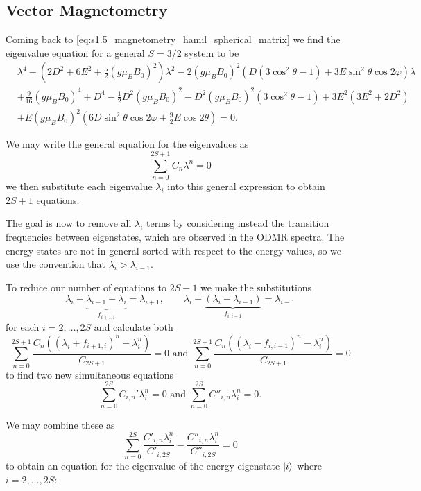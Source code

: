 \subsection{Vector Magnetometry}
Coming back to \eqref{eq:s1.5_magnetometry_hamil_spherical_matrix} we find the eigenvalue equation for a general $S=3/2$ system to be
\begin{equation}
	\begin{align}
		 & \lambda^4 - \left(2D^2 + 6E^2  + \frac{5}{2}(g\mu_B B_0)^2 \right)\lambda^2 - 2 (g \mu_B B_0)^2 \left(D(3 \cos^2 \theta -1) + 3E \sin^2\theta \cos 2\varphi \right)\lambda \\
		 & +\frac{9}{16}(g \mu_B B_0)^4 + D^4 - \frac{1}{2}D^2 (g \mu_B B_0)^2 - D^2 (g \mu_B B_0)^2 (3 \cos^2 \theta - 1) + 3E^2(3E^2 + 2D^2)                                        \\
		 & + E(g\mu_BB_0)^2 (6D \sin^2\theta \cos 2\varphi + \frac{9}{2}E \cos2\theta) = 0.
	\end{align}
	\label{eq:V2_eigenvalue_equation}
\end{equation}

We may write the general equation for the eigenvalues as
\begin{equation}
	\sum_{n=0}^{2S+1} C_n \lambda^n = 0
	\label{eq:}
\end{equation}
we then substitute each eigenvalue $\lambda_i$ into this general expression to obtain $2S + 1$ equations.

The goal is now to remove all $\lambda_i$ terms by considering instead the transition frequencies between eigenstates, which are observed in the ODMR spectra. The energy states are not in general sorted with respect to the energy values, so we use the convention that $\lambda_i > \lambda_{i-1}$.

To reduce our number of equations to $2S-1$ we make the substitutions
$$\lambda_i + \underbrace{\lambda_{i+1} - \lambda_{i}}_{f_{i+1, i}} = \lambda_{i+1},
	\qquad\lambda_i - \underbrace{(\lambda_{i} - \lambda_{i-1})}_{f_{i, i-1}} = \lambda_{i-1}$$
for each $i = 2, \dots, 2S$ and calculate both
$$\sum_{n=0}^{2S +1} \frac{C_n \left((\lambda_i + f_{i+1, i})^n - \lambda_i^n\right)}{C_{2S+1}} = 0\text{ and } \sum_{n=0}^{2S +1}\frac{C_n \left((\lambda_i - f_{i, i-1})^n - \lambda_i^n\right)}{C_{2S + 1}} = 0$$
to find two new simultaneous equations
$$\sum_{n=0}^{2S} C_{i,n}' \lambda_i^n = 0 \text{ and } \sum_{n=0}^{2S} C''_{i,n}\lambda_i^n = 0.$$

We may combine these as
$$\sum_{n=0}^{2S} \frac{C'_{i,n}\lambda_i^n}{C'_{i,2S}}-\frac{C''_{i,n} \lambda_i^n}{C''_{i, 2S}} = 0$$
to obtain an equation for the eigenvalue of the energy eigenstate $\ket{i}$ where $i = 2, \dots, 2S$:

